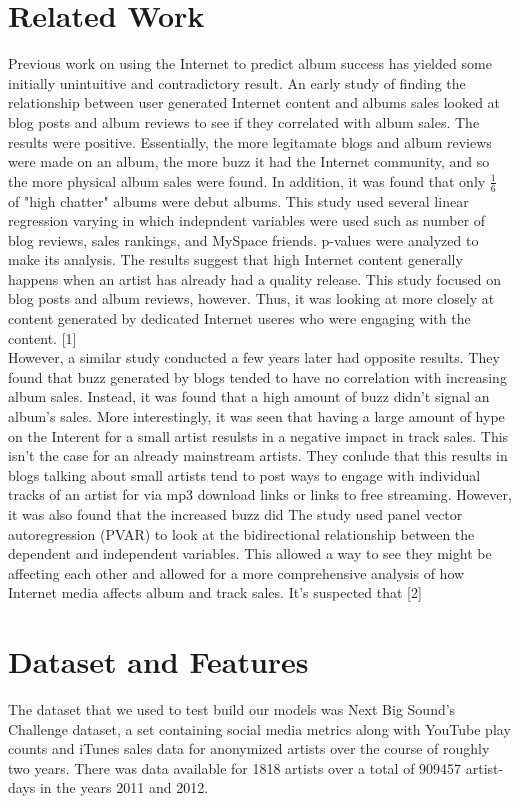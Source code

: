 \documentclass[conference]{IEEEtran}
\begin{document}
\section{Related Work}
Previous work on using the Internet to predict album success has yielded some initially unintuitive and contradictory result. An early study of finding the relationship between user generated Internet content and albums sales looked at blog posts and album reviews to see if they correlated with album sales. The results were positive. Essentially, the more legitamate blogs and album reviews were made on an album, the more buzz it had the Internet community, and so the more physical album sales were found. In addition, it was found that only $\frac{1}{6}$ of "high chatter" albums were debut albums. This study used several linear regression varying in which indepndent variables were used such as number of blog reviews, sales rankings, and MySpace friends. p-values were analyzed to make its analysis. The results suggest that high Internet content generally happens when an artist has already had a quality release. This study focused on blog posts and album reviews, however. Thus, it was looking at more closely at content generated by dedicated Internet useres who were engaging with the content. [1]\\

However, a similar study conducted a few years later had opposite results. They found that buzz generated by blogs tended to have no correlation with increasing album sales. Instead, it was found that a high amount of buzz didn't signal an album's sales. More interestingly, it was seen that having a large amount of hype on the Interent for a small artist resulsts in a negative impact in track sales. This isn't the case for an already mainstream artists. They conlude that this results in blogs talking about small artists tend to post ways to engage with individual tracks of an artist for via mp3 download links or links to free streaming. However, it was also found that the increased buzz did The study used panel vector autoregression (PVAR) to look at the bidirectional relationship between the dependent and independent variables. This allowed a way to see they might be affecting each other and allowed for a more comprehensive analysis of how Internet media affects album and track sales. It's suspected that   [2]





\section{Dataset and Features}
The dataset that we used to test build our models was Next Big Sound's Challenge dataset, a set containing social media metrics along with YouTube play counts and iTunes sales data for anonymized artists over the course of roughly two years. There was data available for 1818 artists over a total of 909457 artist-days in the years 2011 and 2012.
\end{document}
